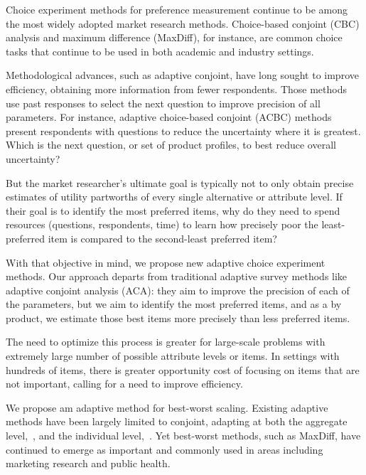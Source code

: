 \documentclass[nonblindrev]{informs3}
\begin{document}
Choice experiment methods for preference measurement continue to be among the most widely adopted market research methods. Choice-based conjoint (CBC) analysis and maximum difference (MaxDiff), for instance, are common choice tasks that continue to be used in both academic and industry settings.

Methodological advances, such as adaptive conjoint, have long sought to improve efficiency, obtaining more information from fewer respondents. Those methods use past responses to select the next question to improve precision of all parameters. For instance, adaptive choice-based conjoint (ACBC) methods present respondents with questions to reduce the uncertainty where it is greatest. Which is the next question, or set of product profiles, to best reduce overall uncertainty?

But the market researcher's ultimate goal is typically not to only obtain precise estimates of utility partworths of every single alternative or attribute level. If their goal is to identify the most preferred items, why do they need to spend resources (questions, respondents, time) to learn how precisely poor the least-preferred item is compared to the second-least preferred item? 

With that objective in mind, we propose new adaptive choice experiment methods. Our approach departs from traditional adaptive survey methods like adaptive conjoint analysis (ACA): they aim to improve the precision of each of the parameters, but we aim to identify the most preferred items, and as a by product, we estimate those best items more precisely than less preferred items. 


The need to optimize this process is greater for large-scale problems with extremely large number of possible attribute levels or items.  In settings with hundreds of items, there is greater opportunity cost of focusing on items that are not important, calling for a need to improve efficiency.

We propose am adaptive method for best-worst scaling. Existing adaptive methods have been largely limited to conjoint, adapting at both the aggregate level,~\cite{arora2001improving}, and the individual level,~\cite{toubia2004polyhedral}. Yet best-worst methods, such as MaxDiff, have continued to emerge as important and commonly used in areas including marketing research and public health. 
\end{document}
